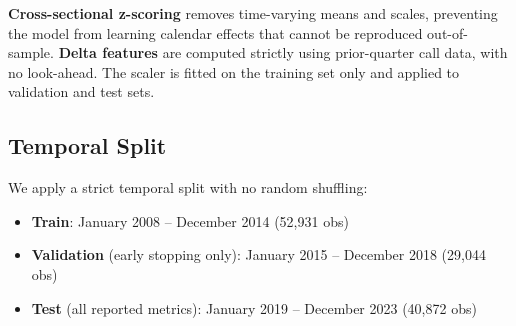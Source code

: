 \textbf{Cross-sectional z-scoring} removes time-varying means and scales, preventing the model from learning calendar effects that cannot be reproduced out-of-sample. \textbf{Delta features} are computed strictly using prior-quarter call data, with no look-ahead. The scaler is fitted on the training set only and applied to validation and test sets.

\subsection{Temporal Split}

We apply a strict temporal split with no random shuffling:
\begin{itemize}[noitemsep]
    \item \textbf{Train}: January 2008 -- December 2014 (52,931 obs)
    \item \textbf{Validation} (early stopping only): January 2015 -- December 2018 (29,044 obs)
    \item \textbf{Test} (all reported metrics): January 2019 -- December 2023 (40,872 obs)
\end{itemize}
